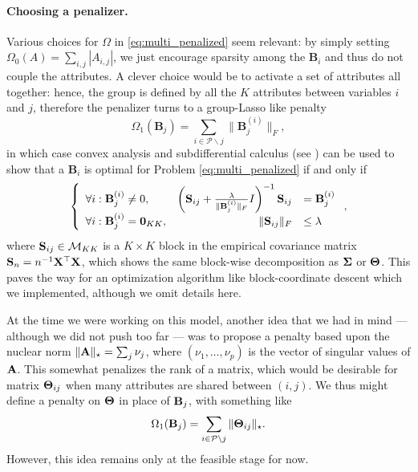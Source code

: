 \paragraph{Choosing  a penalizer.}   Various choices  for $\Omega$  in
\eqref{eq:multi_penalized}   seem   relevant:    by   simply   setting
$\Omega_0(A) = \sum_{i,j} |A_{i,j}|$, we just encourage sparsity among
the $\mathbf{B}_i$  and thus do  not couple the attributes.   A clever
choice would be to activate a set of attributes all together: hence, the
group is defined  by all the $K$ attributes between  variables $i$ and $j$,
therefore the penalizer turns to a group-Lasso like penalty
\begin{equation}
  \label{eq:penalty_grp_variate}
  \Omega_1(\mathbf{B}_j) = \sum_{i \in \mathcal{P}\backslash j} \|\mathbf{B}_j^{(i)}\|_F,
\end{equation}
in  which  case  convex  analysis  and  subdifferential  calculus  (see
\cite{2006_CO_Boyd})  can be  used to  show that  a $\mathbf{B}_i$  is
optimal for Problem \eqref{eq:multi_penalized} if and only if
\begin{equation}
  \label{eq:optimality}
  \left\{\begin{array}{lrl}
      \forall i : \mathbf{B}_j^{(i)} \neq 0, & \left(\mathbf{S}_{ij} +
        \frac{\lambda}{\|\mathbf{B}_j^{(i)}\|_F           }          I
      \right)^{-1} \mathbf{S}_{ij} & = \mathbf{B}_j^{(i)} \\ 
      \forall i : \mathbf{B}_j^{(i)} = \mathbf{0}_{KK}, & 
      \| \mathbf{S}_{ij} \|_F & \leq \lambda \\
  \end{array}\right.,
\end{equation}
where  $\mathbf{S}_{ij}\in\mathcal{M}_{KK}$ is  a  $K\times K$  block in  the
empirical covariance matrix $\mathbf{S}_n  = n^{-1} \mathbf{X}^\top\mathbf{X}$, which shows
the  same block-wise  decomposition as  ${\boldsymbol\Sigma}$ or  $\boldsymbol\Theta$.  This
paves  the way  for  an optimization  algorithm like  block-coordinate
descent which we implemented, although we omit details here.

At the time we were working on this model, another idea that we had in
mind --- although we  did not push too far --- was  to propose a penalty
based  upon the  nuclear norm  $\|\mathbf{A}\|_\star =  \sum_j \nu_j$,  where
$(\nu_1, \dots,\nu_p)$ is the vector of singular values of $\mathbf{A}$. This
somewhat penalizes the rank of a  matrix, which would be desirable for
matrix $\boldsymbol\Theta_{ij}$ when many attributes are shared between $(i,j)$.
We thus might define a penalty  on $\boldsymbol\Theta$ in place of $\mathbf{B}_j$, with
something like
\begin{equation}
  \label{eq:penalty_rank_variate}
  \Omega_1(\mathbf{B}_j)  =   \sum_{i  \in   \mathcal{P}\backslash  j}
  \|\boldsymbol\Theta_{ij} \|_\star.
\end{equation}
However, this idea remains only at the feasible stage for now.

